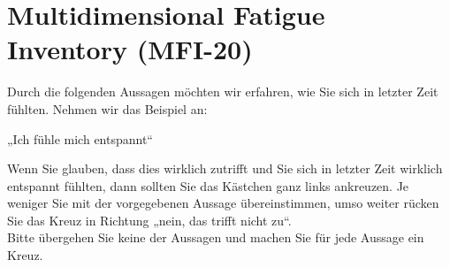 \setcounter{section}{5}  
\section{Multidimensional Fatigue Inventory (MFI-20) }
 
Durch die folgenden Aussagen möchten wir erfahren, wie Sie sich in letzter Zeit fühlten. Nehmen wir das Beispiel an:	\begin{center}
„Ich fühle mich entspannt“
\end{center}	                                                                
Wenn Sie glauben, dass dies wirklich zutrifft und Sie sich in letzter Zeit wirklich entspannt fühlten, dann sollten Sie das Kästchen ganz links ankreuzen. Je weniger Sie mit der vorgegebenen Aussage übereinstimmen, umso weiter rücken Sie das Kreuz in Richtung „nein, das trifft nicht zu“. \\
Bitte übergehen Sie keine der Aussagen und machen Sie für jede Aussage ein Kreuz.

